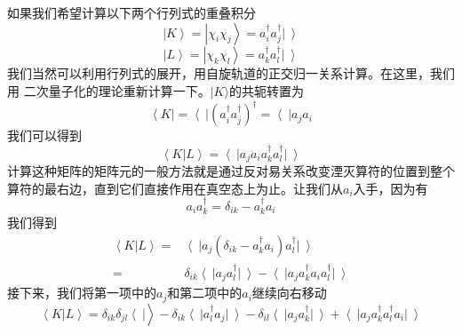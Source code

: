 \documentclass[12pt,a4paper,openany,twoside]{book}
\numberwithin{equation}{section}
\begin{document}
          如果我们希望计算以下两个行列式的重叠积分
          \begin{equation}
            \left|K\right\rangle=\left|\chi_i\chi_j\right\rangle=a_i^\dagger a_j^\dagger\left|\ \right\rangle
          \end{equation}
          \begin{equation}
            \left|L\right\rangle=\left|\chi_k\chi_l\right\rangle=a_k^\dagger a_l^\dagger\left|\ \right\rangle
          \end{equation}
          我们当然可以利用行列式的展开，用自旋轨道的正交归一关系计算。在这里，我们用  二次量子化的理论重新计算一下。$|K\rangle$的共轭转置为
          \begin{equation}
            \left\langle K\right|=\left\langle\ \right|(a_i^\dagger a_j^\dagger)^\dagger
            =\left\langle\ \right|a_j a_i
          \end{equation}
          我们可以得到
          \begin{equation}
            \left\langle K\right|\left.L\right\rangle=\left\langle\ \right|a_j a_i
            a_k^\dagger a_l^\dagger\left|\ \right\rangle
          \end{equation}
          计算这种矩阵的矩阵元的一般方法就是通过反对易关系改变湮灭算符的位置到整个算符的最右边，直到它们直接作用在真空态上为止。让我们从$a_i$入手，因为有
          \begin{equation}
            a_i a_k^\dagger=\delta_{ik}-a_k^\dagger a_i
          \end{equation}
          我们得到
          \begin{equation}
            \begin{aligned}
              \left\langle K\right|\left.L\right\rangle=&\left\langle\ \right|a_j\left(\delta_{ik}-a_k^\dagger a_i\right)a_l^\dagger\left|\ \right\rangle\\
              =&\delta_{ik}\left\langle\ \right|a_j a_l^\dagger\left|\ \right\rangle-
              \left\langle\ \right|a_j a_k^\dagger a_i a_l^\dagger\left|\ \right\rangle
            \end{aligned}
          \end{equation}
          接下来，我们将第一项中的$a_j$和第二项中的$a_i$继续向右移动
          \begin{equation}
            \left\langle K\right|\left.L\right\rangle=\delta_{ik}\delta_{jl}\left\langle\ \right|\left.\right\rangle
            -\delta_{ik} \left\langle\ \right|a_l^\dagger a_j\left|\ \right\rangle
            -\delta_{il} \left\langle\ \right|a_j a_k^\dagger\left|\ \right\rangle
            +\left\langle\ \right|a_j a_k^\dagger a_l^\dagger a_i\left|\ \right\rangle
          \end{equation}
\end{document}
